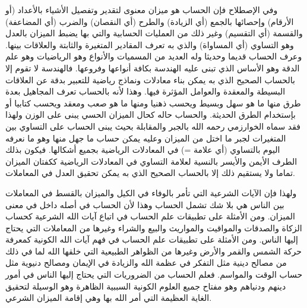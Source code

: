 وفي الإصطلاح فإن الحساب هو ميزان معنوى لتقدير وتفصيل الأشياء بالأعداد (أو الأرقام) وإحصائها بالجمع (أي الزيادة) والطرح (أي النقصان) والضرب (أي المضاعفة) والقسمة (أي التقسيم) وغير ذلك من العمليات الحسابية والتي بها يضبط الميزان بالعدل وهو التساوي (أي المساواة) والذي به تعرف المقادير المتغيرة والثابتة والعلاقات بينها. وعرف الحساب قديما وحديثا وله العديد من المسميات والأنواع وهو الرياضيات وهو علم الدقة وهو الأساس الذي تبنى عليه الهندسة بكافة أنواعها وفروعها. فالهندسة لا تقوم إلا بالحساب الصحيح الذي به يمكن بناء معادلات ونماذج رياضية للتعبير بدقة عن العلاقات البسيطة والمعقدة والعوامل المؤثرة فيها. وهذا لأنه بالحساب تعرف المجاهيل بعدة طرق منها ما هو سهل وبسيط ويحسب ذهنيا ومنها ما هو صعب ومعقد ويحسب كتابيا أو بإستخدام الطرق الحديثة. والحساب حاله كحال الميزان الحسي يبنى على الوزن ولهذا فقد سماه الخوارزمي رحمه الله بالجبر والمقابلة بحيث يبنى الحساب على التساوي بين المتغيرات لجبر ما اختل من الميزان وعليه يمكن حساب ما جهل منها وهو ما نعرفه اليوم بالتساوي (أي علامة =) في المعادلات الرياضية بجميع أشكالها. فيكون بذلك الطرف الأيمن والأيسر بالنسية لعلامة التساوي في المعادلات الرياضية ككفتان الميزان تماما ولا يستقيم ذلك إلا بالحساب الصحيح الذي به يمكن تحقيق العدل في المعاملات.

ولهذا فإن الآيات الشرعية التي تأمر بالوفاء في الكيل والميزان بالقسط في المعاملات بين الناس هي بلا شك تشمل الحساب وهذا لأن الحساب في أصله داخل في معنى الميزان. ومن الأمثلة على تطبيقات علم الحساب في اتباع آيات الله الشرعية كحساب الزكاة والصدقات والمواقيت والمواريث والبيع والشراء وغيرها من المعاملات التي يحتاج إليها الناس.  ومن الأمثلة على تطبيقات علم الحساب في فهم آيات الله الكونية كمعرفة حركة الشمس والقمر والأرض وغيرها من الظواهر الطبيعية التي خلقها الله لما في ذلك من مصالح دينية مثل التفكر في عظمة الله والزيادة في الإيمان ومصالح دنيوية مثل حساب الوقت والمواسم. فعلم الحساب من الضروريات التي يحتاج إليها الناس في أمور دينهم ودنياهم وهو مفتاح جميع العلوم الكونية السببية الظاهرة وهو الوسيلة لتحقيق الغاية العظيمة التي أمر الله بها وهي إقامة الميزان الشرعي. 


